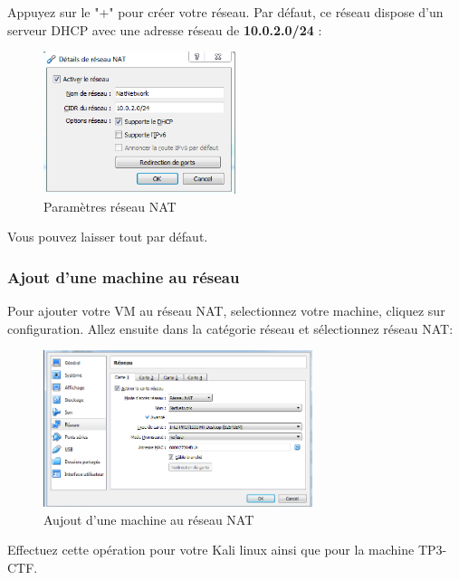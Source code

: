 Appuyez sur le "+" pour créer votre réseau. Par défaut, ce réseau dispose d'un serveur DHCP avec une adresse réseau de \textbf{10.0.2.0/24} :
\begin{figure}[htp!]
  \centering
  \setlength\figureheight{7cm}
  \setlength\figurewidth{9cm}
  \includegraphics[width=0.5\textwidth]{oui/TP3/imageCTF2.png}
  \caption{Paramètres réseau NAT}
  \label{fig:courbe-tikz}
\end{figure}

Vous pouvez laisser tout par défaut.

\subsubsection{Ajout d'une machine au réseau}

Pour ajouter votre VM au réseau NAT, selectionnez votre machine, cliquez sur configuration. Allez ensuite dans la catégorie réseau et sélectionnez réseau NAT:

\begin{figure}[htp!]
  \centering
  \setlength\figureheight{7cm}
  \setlength\figurewidth{9cm}
  \includegraphics[width=0.7\textwidth]{oui/TP3/imageCTF3.png}
  \caption{Aujout d'une machine au réseau NAT}
  \label{fig:courbe-tikz}
\end{figure}

Effectuez cette opération pour votre Kali linux ainsi que pour la machine TP3-CTF.